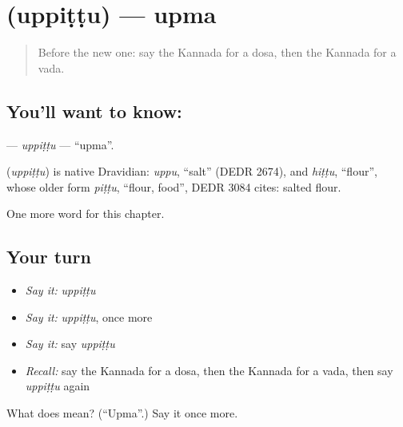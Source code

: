 \section[\texorpdfstring{\kn{ಉಪ್ಪಿಟ್ಟು} (uppiṭṭu)}{ಉಪ್ಪಿಟ್ಟು (uppiṭṭu)}]{ (uppiṭṭu) — upma}

\label{lesson:KA-C125-uppittu}



\begin{quote}
Before the new one: say the Kannada for a dosa, then the Kannada for a vada.
\end{quote}

\subsection*{You'll want to know: }
\textbf{} — \emph{uppiṭṭu} — \textquotedblleft{}upma\textquotedblright{}.

\begin{cousinweb}
\textbf{} (\emph{uppiṭṭu}) is native Dravidian: \emph{uppu}, \textquotedblleft{}salt\textquotedblright{} (DEDR 2674), and \emph{hiṭṭu}, \textquotedblleft{}flour\textquotedblright{}, whose older form \emph{piṭṭu}, \textquotedblleft{}flour, food\textquotedblright{}, DEDR 3084 cites: salted flour.
\end{cousinweb}

\begin{grammarlens}[title={What you've built}]
One more word for this chapter.
\end{grammarlens}

\subsection*{Your turn}
\begin{itemize}
\raggedright
  \item \emph{Say it:} \emph{uppiṭṭu}
  \item \emph{Say it:} \emph{uppiṭṭu}, once more
  \item \emph{Say it:} say \emph{uppiṭṭu}
  \item \emph{Recall:} say the Kannada for a dosa, then the Kannada for a vada, then say \emph{uppiṭṭu} again
\end{itemize}

\begin{tcolorbox}[breakable,colback=teal!4,colframe=teal!35!black,title={Before you move on}]
What does  mean? (\textquotedblleft{}Upma\textquotedblright{}.) Say it once more.
\end{tcolorbox}
